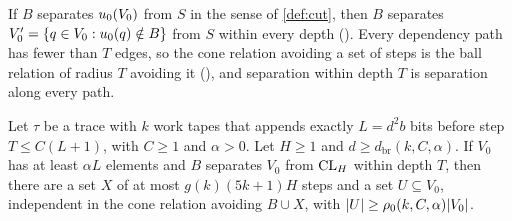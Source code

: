 If $B$ separates $u_0(V_0)$ from $S$ in the sense of \cref{def:cut}, then $B$ separates $V_0'=\{q\in V_0:u_0(q)\notin B\}$
from $S$ within every depth (). Every dependency path has fewer than $T$ edges, so
the cone relation avoiding a set of steps is the ball relation of radius $T$ avoiding it (),
and separation within depth $T$ is separation along every path.

\begin{theorem}[Bridge]\label{thm:bridge}
Let $\tau$ be a trace with $k$ work tapes that appends exactly $L=d^2b$ bits before step $T\le C(L+1)$, with $C\ge1$ and
$\alpha>0$. Let $H\ge1$ and $d\ge d_{\mathrm{br}}(k,C,\alpha)$. If $V_0$ has at least $\alpha L$ elements and $B$ separates $V_0$ from
$\mathrm{CL}_H$ within depth $T$, then there are a set $X$ of at most $g(k)(5k+1)H$ steps and a set $U\subseteq V_0$, independent in the cone
relation avoiding $B\cup X$, with $\lvert U \rvert\ge\rho_0(k,C,\alpha)\lvert V_0 \rvert$.
\end{theorem}

